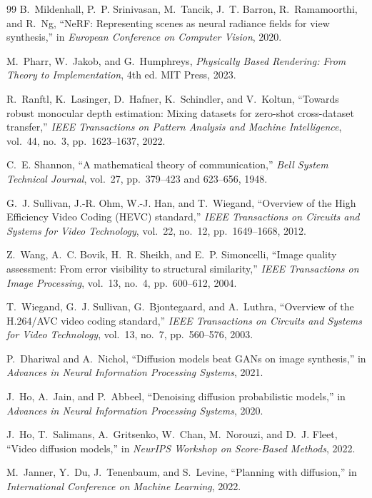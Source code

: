 \documentclass[11pt,a4paper]{article}
\theoremstyle{plain}
\theoremstyle{definition}
\theoremstyle{remark}
\begin{document}
\begin{thebibliography}{99}
B.~Mildenhall, P.~P. Srinivasan, M.~Tancik, J.~T. Barron, R.~Ramamoorthi, and R.~Ng, ``NeRF: Representing scenes as neural radiance fields for view synthesis,'' in \textit{European Conference on Computer Vision}, 2020.

M.~Pharr, W.~Jakob, and G.~Humphreys, \textit{Physically Based Rendering: From Theory to Implementation}, 4th ed. MIT Press, 2023.

R.~Ranftl, K.~Lasinger, D.~Hafner, K.~Schindler, and V.~Koltun, ``Towards robust monocular depth estimation: Mixing datasets for zero-shot cross-dataset transfer,'' \textit{IEEE Transactions on Pattern Analysis and Machine Intelligence}, vol.~44, no.~3, pp.~1623--1637, 2022.

C.~E. Shannon, ``A mathematical theory of communication,'' \textit{Bell System Technical Journal}, vol.~27, pp.~379--423 and 623--656, 1948.

G.~J. Sullivan, J.-R. Ohm, W.-J. Han, and T.~Wiegand, ``Overview of the High Efficiency Video Coding (HEVC) standard,'' \textit{IEEE Transactions on Circuits and Systems for Video Technology}, vol.~22, no.~12, pp.~1649--1668, 2012.

Z.~Wang, A.~C. Bovik, H.~R. Sheikh, and E.~P. Simoncelli, ``Image quality assessment: From error visibility to structural similarity,'' \textit{IEEE Transactions on Image Processing}, vol.~13, no.~4, pp.~600--612, 2004.

T.~Wiegand, G.~J. Sullivan, G.~Bjontegaard, and A.~Luthra, ``Overview of the H.264/AVC video coding standard,'' \textit{IEEE Transactions on Circuits and Systems for Video Technology}, vol.~13, no.~7, pp.~560--576, 2003.


P.~Dhariwal and A.~Nichol, ``Diffusion models beat GANs on image synthesis,'' in \textit{Advances in Neural Information Processing Systems}, 2021.

J.~Ho, A.~Jain, and P.~Abbeel, ``Denoising diffusion probabilistic models,'' in \textit{Advances in Neural Information Processing Systems}, 2020.

J.~Ho, T.~Salimans, A.~Gritsenko, W.~Chan, M.~Norouzi, and D.~J. Fleet, ``Video diffusion models,'' in \textit{NeurIPS Workshop on Score-Based Methods}, 2022.

M.~Janner, Y.~Du, J.~Tenenbaum, and S.~Levine, ``Planning with diffusion,'' in \textit{International Conference on Machine Learning}, 2022.


\end{thebibliography}
\end{document}
